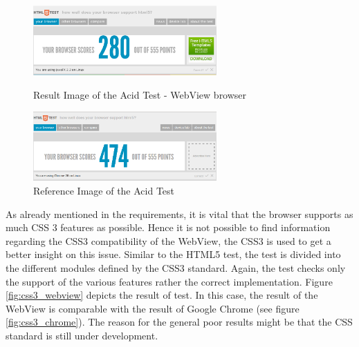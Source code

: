 \begin{figure}
\begin{minipage}[t]{7cm}
	\centering
	\includegraphics[width=7cm]{./img/tech-ana/html5_result_webview.png}
	\caption{Result Image of the Acid Test - WebView browser}
	\label{fig:html5_webview}
\end{minipage}
\hfill
\begin{minipage}[t]{7cm}
	\centering
	\includegraphics[width=7cm]{./img/tech-ana/html5_result_chrome.png}
	\caption{Reference Image of the Acid Test}
	\label{fig:html5_chrome}
\end{minipage}
\end{figure}


As already mentioned in the requirements, it is vital that the browser supports as much CSS 3 features as possible.
Hence it is not possible to find information regarding the CSS3 compatibility of the WebView, the CSS3 \autocite{tech-ana:css3-test}is used to get a better insight on this issue.
Similar to the HTML5 test, the test is divided into the different modules defined by the CSS3 standard.
Again, the test checks only the support of the various features rather the correct implementation.
Figure \ref{fig:css3_webview} depicts the result of test.
In this case, the result of the WebView is comparable with the result of Google Chrome (see figure \ref{fig:css3_chrome}).
The reason for the general poor results might be that the CSS standard is still under development.

